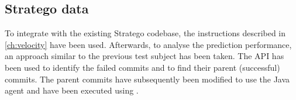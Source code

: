 
\subsection{Stratego data}
To integrate \velocity{} with the existing Stratego codebase, the instructions described in \cref{ch:velocity} have been used. Afterwards, to analyse the prediction performance, an approach similar to the previous test subject has been taken. The \github{} API has been used to identify the failed commits and to find their parent (successful) commits. The parent commits have subsequently been modified to use the \velocity{} Java agent and have been executed using \githubactions{}.
